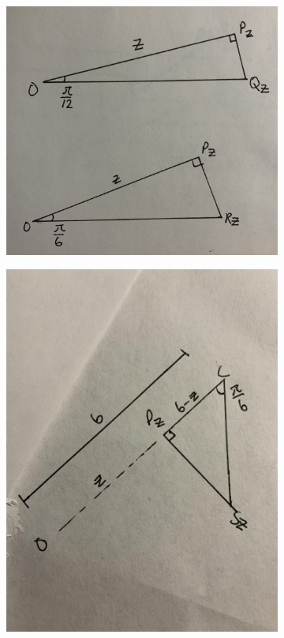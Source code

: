 \documentclass{article}
\begin{document}
    \begin{figure}[hbt!]
        \centering
        \begin{subfigure}[b]{.45\textwidth}
            \includegraphics[scale=0.06]{triangles}
        \end{subfigure}
        \begin{subfigure}[b]{.45\textwidth}
            \includegraphics[scale=0.12]{triangle3}
        \end{subfigure}
    \end{figure}
\end{document}
